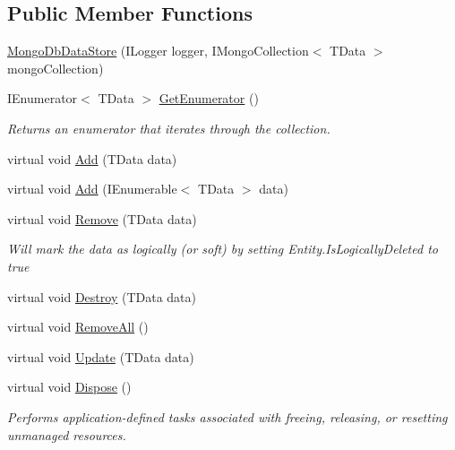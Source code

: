 \subsection*{Public Member Functions}
\begin{DoxyCompactItemize}
\item 
\hyperlink{classCqrs_1_1MongoDB_1_1DataStores_1_1MongoDbDataStore_a039b75f6f011fa89b5dd724bee6b64cb}{Mongo\+Db\+Data\+Store} (I\+Logger logger, I\+Mongo\+Collection$<$ T\+Data $>$ mongo\+Collection)
\item 
I\+Enumerator$<$ T\+Data $>$ \hyperlink{classCqrs_1_1MongoDB_1_1DataStores_1_1MongoDbDataStore_a2bab987d4d7f3c6b2ab3a3e04878cf98}{Get\+Enumerator} ()
\begin{DoxyCompactList}\small\item\em Returns an enumerator that iterates through the collection. \end{DoxyCompactList}\item 
virtual void \hyperlink{classCqrs_1_1MongoDB_1_1DataStores_1_1MongoDbDataStore_affcb1268469b99963501dd8c58e4a480}{Add} (T\+Data data)
\item 
virtual void \hyperlink{classCqrs_1_1MongoDB_1_1DataStores_1_1MongoDbDataStore_a709fc1e29d266a7c19a46bd181d03963}{Add} (I\+Enumerable$<$ T\+Data $>$ data)
\item 
virtual void \hyperlink{classCqrs_1_1MongoDB_1_1DataStores_1_1MongoDbDataStore_a14b43546e8d1e1832358e1cf2f8535f1}{Remove} (T\+Data data)
\begin{DoxyCompactList}\small\item\em Will mark the {\itshape data}  as logically (or soft) by setting Entity.\+Is\+Logically\+Deleted to true \end{DoxyCompactList}\item 
virtual void \hyperlink{classCqrs_1_1MongoDB_1_1DataStores_1_1MongoDbDataStore_a4650c780f34e320ba39f312e3b04555d}{Destroy} (T\+Data data)
\item 
virtual void \hyperlink{classCqrs_1_1MongoDB_1_1DataStores_1_1MongoDbDataStore_ac0cb8626e8f8ab0275a31e88a920ee3e}{Remove\+All} ()
\item 
virtual void \hyperlink{classCqrs_1_1MongoDB_1_1DataStores_1_1MongoDbDataStore_af86a3df56e2df92fb9ef880ff4fa5f16}{Update} (T\+Data data)
\item 
virtual void \hyperlink{classCqrs_1_1MongoDB_1_1DataStores_1_1MongoDbDataStore_a5003aba35b02f686cbacf5832a14cf46}{Dispose} ()
\begin{DoxyCompactList}\small\item\em Performs application-\/defined tasks associated with freeing, releasing, or resetting unmanaged resources. \end{DoxyCompactList}\end{DoxyCompactItemize}
